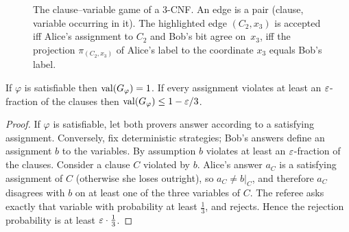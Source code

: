 \begin{figure}[t]
\centering
{}
\caption{The clause--variable game of a $3$-CNF.  An edge is a pair (clause, variable occurring in it).
The highlighted edge $(C_2,x_3)$ is accepted iff Alice's assignment to $C_2$ and Bob's bit agree on~$x_3$,
\ie iff the projection $\pi_{(C_2,x_3)}$ of Alice's label to the coordinate $x_3$ equals Bob's label.}
\label{fig:cv}
\end{figure}

\begin{proposition}\label{prop:cv}
If $\varphi$ is satisfiable then $\operatorname{val}(G_\varphi)=1$.  If every assignment violates at least an
$\varepsilon$-fraction of the clauses then $\operatorname{val}(G_\varphi)\le1-\varepsilon/3$.
\end{proposition}
\begin{proof}
If $\varphi$ is satisfiable, let both provers answer according to a satisfying assignment.
Conversely, fix deterministic strategies; Bob's answers define an assignment $b$ to the variables.
By assumption $b$ violates at least an $\varepsilon$-fraction of the clauses.  Consider a clause $C$ violated by $b$.
Alice's answer $a_C$ is a satisfying assignment of $C$ (otherwise she loses outright), so $a_C\ne b|_C$,
and therefore $a_C$ disagrees with $b$ on at least one of the three variables of $C$.  The referee asks
exactly that variable with probability at least $\tfrac13$, and rejects.  Hence the rejection probability is
at least $\varepsilon\cdot\tfrac13$.
\end{proof}

